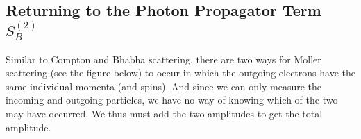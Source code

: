 \subsection{Returning to the Photon Propagator Term \texorpdfstring{$S_B^{(2)}$}{TEXT}}
Similar to Compton and Bhabha scattering, there are two ways for Moller scattering (see the figure below) to occur in which the outgoing electrons have the same individual momenta (and spins). And since we can only measure the incoming and outgoing particles, we have no way of knowing which of the two may have occurred. We thus must add the two amplitudes to get the total amplitude.
\begin{figure}[H]
    \centering


\begin{tikzpicture}[x=0.75pt,y=0.75pt,yscale=-1,xscale=1]


\end{tikzpicture}
\end{figure}

